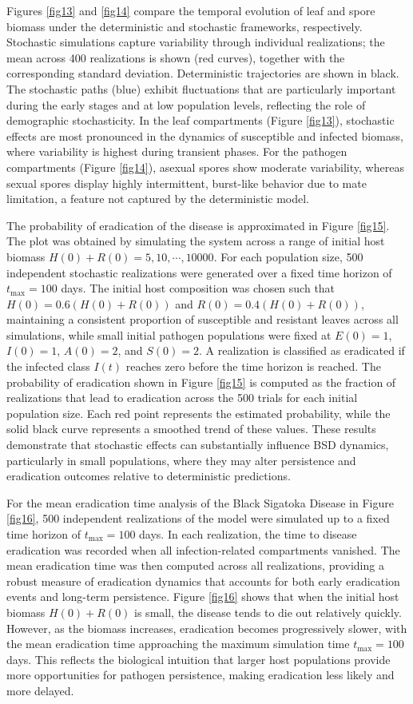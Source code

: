\documentclass[11pt]{article}
\numberwithin{equation}{section}
\begin{document}
Figures \ref{fig13} and \ref{fig14} compare the temporal evolution of leaf and spore biomass under the deterministic and stochastic frameworks, respectively. Stochastic simulations capture variability through individual realizations; the mean across 400 realizations is shown (red curves), together with the corresponding standard deviation. Deterministic trajectories are shown in black. 
The stochastic paths (blue) exhibit fluctuations that are particularly important during the early stages and at low population levels, reflecting the role of demographic stochasticity. In the leaf compartments (Figure \ref{fig13}), stochastic effects are most pronounced in the dynamics of susceptible and infected biomass, where variability is highest during transient phases. For the pathogen compartments (Figure \ref{fig14}), asexual spores show moderate variability, whereas sexual spores display highly intermittent, burst-like behavior due to mate limitation, a feature not captured by the deterministic model. 

The probability of eradication of the disease is approximated in Figure \ref{fig15}. The plot was obtained by simulating the system across a range of initial host biomass $H(0)+R(0)=5,10,\cdots,10000$. For each population size, 500 independent stochastic realizations were generated over a fixed time horizon of $t_{\max}=100$ days. The initial host composition was chosen such that $H(0)=0.6(H(0)+R(0))$ and $R(0)=0.4(H(0)+R(0))$, maintaining a consistent proportion of susceptible and resistant leaves across all simulations, while small initial pathogen populations were fixed at $E(0)=1$, $I(0)=1$, $A(0)=2$, and  $S(0)=2$. A realization is classified as eradicated if the infected class $I(t)$ reaches zero before the time horizon is reached. The probability of eradication shown in Figure \ref{fig15} is computed as the fraction of realizations that lead to eradication across the 500 trials for each initial population size. Each red point represents the estimated probability, while the solid black curve represents a smoothed trend of these values. These results demonstrate that stochastic effects can substantially influence BSD dynamics, particularly in small populations, where they may alter persistence and eradication outcomes relative to deterministic predictions.

For the mean eradication time analysis of the Black Sigatoka Disease in Figure \ref{fig16}, 500 independent realizations of the model were simulated up to a fixed time horizon of $t_{\max}=100$ days. In each realization, the time to disease eradication was recorded when all infection-related compartments vanished. The mean eradication time was then computed across all realizations, providing a robust measure of eradication dynamics that accounts for both early eradication events and long-term persistence. Figure \ref{fig16} shows that when the initial host biomass $H(0)+R(0)$ is small, the disease tends to die out relatively quickly. However, as the biomass increases, eradication becomes progressively slower, with the mean eradication time approaching the maximum simulation time $t_{\max}=100$ days. This reflects the biological intuition that larger host populations provide more opportunities for pathogen persistence, making eradication less likely and more delayed.
\end{document}
